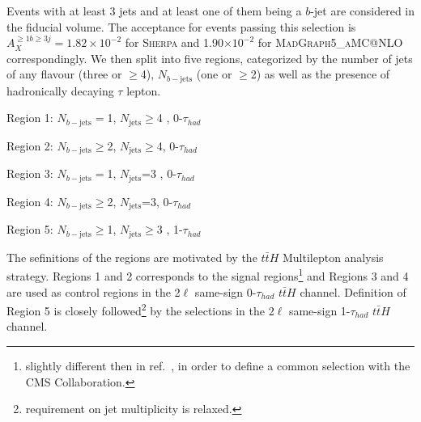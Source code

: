 Events with at least 3 jets and at least one of them being a $b$-jet are considered in the fiducial volume. 
The acceptance for events passing this selection is $A_X^{\geq1b\geq3j}=1.82\times10^{-2}$ for \textsc{Sherpa} and 1.90$\times10^{-2}$ for \textsc{MadGraph5\_aMC@NLO} correspondingly.
We then split into five regions, categorized by the number of jets of any flavour (three or  $\geq$4), $N_{b-\mathrm{jets}}$ (one or $\geq$2) as well as the presence of hadronically decaying $\tau$ lepton. 
				\begin{description}
				\item Region 1: $N_{b-\mathrm{jets}}=$1, $N_{\mathrm{jets}}\geq$4 , 0-$\tau_{had}$
				\item Region 2: $N_{b-\mathrm{jets}}\geq$2,   $N_{\mathrm{jets}}\geq$4, 0-$\tau_{had}$
				\item Region 3: $N_{b-\mathrm{jets}}=$1,  $N_{\mathrm{jets}}$=3 , 0-$\tau_{had}$
				\item Region 4: $N_{b-\mathrm{jets}}\geq$2, $N_{\mathrm{jets}}$=3, 0-$\tau_{had}$
				\item Region 5: $N_{b-\mathrm{jets}}\geq$1, $N_{\mathrm{jets}}\geq$3 , 1-$\tau_{had}$
				\end{description}
The sefinitions of the regions are motivated by the $t\bar{t}H$ Multilepton analysis strategy.
Regions 1 and 2 corresponds to the signal regions\footnote{slightly different then in ref.~\cite{ATLAS-CONF-2019-045}, in order to define a common selection with the CMS Collaboration.} and Regions 3 and 4 are used as control regions in the 2$\ell$ same-sign  0-$\tau_{had}$ $t\bar{t}H$ channel.
Definition of Region 5 is closely followed\footnote{requirement on jet multiplicity is relaxed.} by the selections in the 2$\ell$ same-sign 1-$\tau_{had}$ $t\bar{t}H$ channel.





